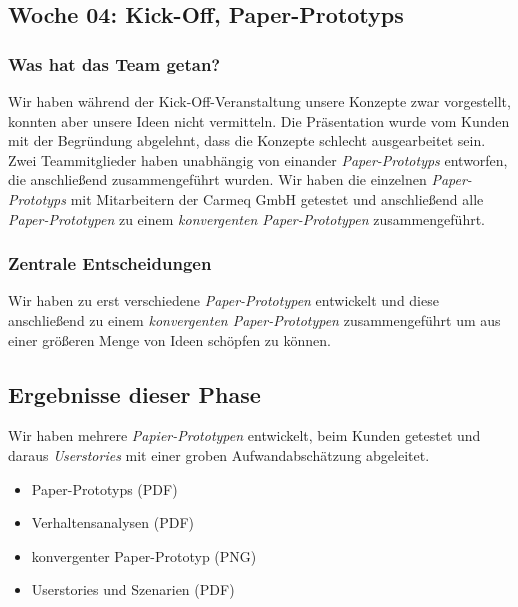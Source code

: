 \documentclass{article}
\begin{document}
\subsection{Woche 04: Kick-Off, Paper-Prototyps}

\subsubsection{Was hat das Team getan?}

Wir haben w\"ahrend der Kick-Off-Veranstaltung unsere Konzepte zwar vorgestellt, konnten aber unsere Ideen nicht vermitteln. Die Pr\"asentation wurde vom Kunden mit der Begr\"undung abgelehnt, dass die Konzepte schlecht ausgearbeitet sein.\\
Zwei Teammitglieder haben unabh\"angig von einander \textit{Paper-Prototyps} entworfen, die anschlie\ss end zusammengef\"uhrt wurden. Wir haben die einzelnen \textit{Paper-Prototyps} mit Mitarbeitern der Carmeq GmbH getestet und anschlie\ss end alle \textit{Paper-Prototypen} zu einem \textit{konvergenten Paper-Prototypen} zusammengef\"uhrt.

\subsubsection{Zentrale Entscheidungen}

Wir haben zu erst verschiedene \textit{Paper-Prototypen} entwickelt und diese anschlie\ss end zu einem \textit{konvergenten Paper-Prototypen} zusammengef\"uhrt um aus einer gr\"o\ss eren Menge von Ideen sch\"opfen zu k\"onnen. 

\subsection{Ergebnisse dieser Phase}

Wir haben mehrere \textit{Papier-Prototypen} entwickelt, beim Kunden getestet und daraus \textit{Userstories} mit einer groben Aufwandabsch\"atzung abgeleitet.

\begin{itemize}
\item Paper-Prototyps (PDF)
\item Verhaltensanalysen (PDF)
\item konvergenter Paper-Prototyp (PNG)
\item Userstories und Szenarien (PDF)
\end{itemize}
\end{document}
